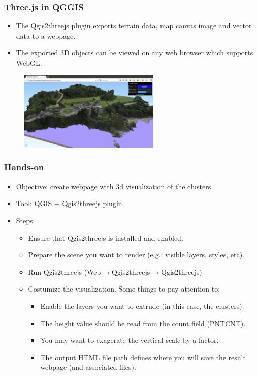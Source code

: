 \documentclass[hyperref={pdfpagelabels=true}]{beamer}
\begin{document}
\begin{frame}
\frametitle{Three.js in QGGIS}
  \begin{itemize}
    \item<1->The Qgis2threejs plugin exports terrain data, map canvas image and vector data to a webpage.
    \item<2->The exported 3D objects can be viewed on any web browser which supports WebGL.%
  \end{itemize}
    \begin{figure}  
      \includegraphics[width=0.6\textwidth]{3js.jpg}    
     \end{figure}  
\end{frame}

\begin{frame}
\frametitle{Hands-on}
\begin{itemize}
  \item<1->Objective: create webpage with 3d visualization of the clusters.
  \item<1->Tool: QGIS + Qgis2threejs plugin.
  \item<1->Steps:  
  \begin{itemize}
    \item<2->Ensure that Qgis2threejs is installed and enabled.  
    \item<3->Prepare the scene you want to render (e.g.: visible layers, styles, etc).
    \item<4->Run Qgis2threejs (Web$\rightarrow$Qgis2threejs$\rightarrow$Qgis2threejs)
    \item<5->Costumize the visualization. Some things to pay attention to:
      \begin{itemize}
	\item<6->Enable the layers you want to extrude (in this case, the clusters).      
	\item<6->The height value should be read from the count field (PNTCNT).	
	\item<6->You may want to exagerate the vertical scale by a factor.
	\item<6->The output HTML file path defines where you will save the result webpage (and associated files).	
      \end{itemize}    
  \end{itemize}    
\end{itemize}  
\end{frame}
\end{document}
